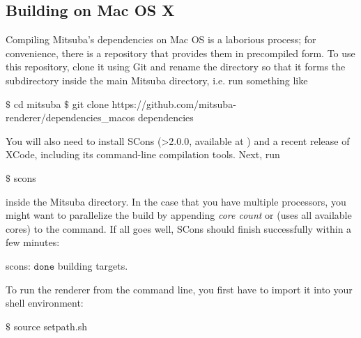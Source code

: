 \subsection{Building on Mac OS X}
\vspace{-5mm}
Compiling Mitsuba's dependencies on Mac OS is a laborious process; for convenience, there
is a repository that provides them in precompiled form. To use this repository, clone it
using Git and rename the directory so that it forms the  subdirectory
inside the main Mitsuba directory, i.e. run something like
\begin{shell}
$\text{\$}$ cd mitsuba
$\text{\$}$ git clone https://github.com/mitsuba-renderer/dependencies_macos dependencies
\end{shell}
You will also need to install SCons (>2.0.0, available at ) and
a recent release of XCode, including its command-line compilation tools. Next, run
\begin{shell}
$\text{\$}$ scons
\end{shell}
inside the Mitsuba directory. In the case that you have multiple processors, you might want to parallelize the build by appending \emph{core count} or  (uses all available cores) to the command.
If all goes well, SCons should finish successfully within a few minutes:
\begin{shell}
scons: $\texttt{done}$ building targets.
\end{shell}
To run the renderer from the command line, you first have to import it into your shell environment:
\begin{shell}
$\text{\$}$ source setpath.sh
\end{shell}
